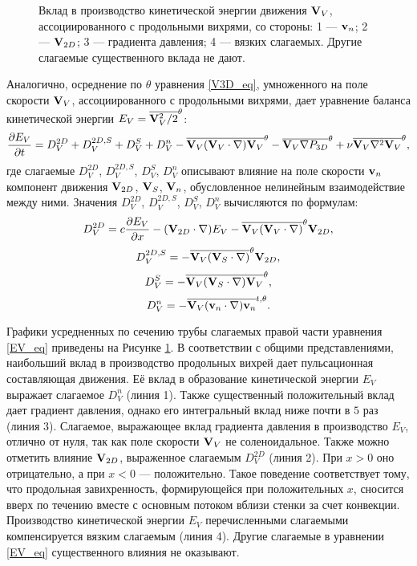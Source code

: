\begin{figure}
\caption{Вклад в производство кинетической энергии движения $\mathbf{V}_V$, ассоциированного с продольными вихрями, со стороны: 1 --- $\mathbf{v}_n$; 2 --- $\mathbf{V}_{2D}$; 3 --- градиента давления; 4 --- вязких слагаемых. Другие слагаемые существенного вклада не дают.}
\label{ev_parts_pic}
\end{figure}

Аналогично, осреднение по $\theta$ уравнения \eqref{V3D_eq}, умноженного на поле скорости $\mathbf{V}_V$, ассоциированного с продольными вихрями, дает уравнение баланса кинетической энергии $E_V = \overline{\mathbf{V}_V^2/2}^\theta$:
\begin{equation}\label{EV_eq}
\frac{\partial E_V}{\partial t} = D_V^{2D} + D_V^{2D,S} + D_V^{S} + D_V^n - \overline{\mathbf{V}_V (\mathbf{V}_V \cdot \nabla) \mathbf{V}_V}^\theta - \overline{\mathbf{V}_V \nabla P_{3D}}^\theta + \nu \overline{\mathbf{V}_V \nabla^2 \mathbf{V}_V}^\theta,
\end{equation}
где слагаемые $D_V^{2D}$, $D_V^{2D,S}$, $D_V^S$, $D_V^n$ описывают влияние на поле скорости $\mathbf{v}_n$ компонент движения $\mathbf{V}_{2D}$, $\mathbf{V}_S$, $\mathbf{V}_n$, обусловленное нелинейным взаимодействие между ними. Значения $D_V^{2D}$, $D_V^{2D,S}$, $D_V^S$, $D_V^n$ вычисляются по формулам:
$$
D_V^{2D} = c \frac{\partial E_V}{\partial x} - (\mathbf{V}_{2D} \cdot \nabla) E_V - \overline{\mathbf{V}_V (\mathbf{V}_V \cdot \nabla)}^\theta \mathbf{V}_{2D},
$$
$$
D_V^{2D,S} = - \overline{\mathbf{V}_V (\mathbf{V}_S \cdot \nabla)}^\theta \mathbf{V}_{2D},
$$
$$
D_V^{S} = - \overline{\mathbf{V}_V (\mathbf{V}_S \cdot \nabla) \mathbf{V}_V}^\theta,
$$
$$
D_V^n = - \overline{\mathbf{V}_V (\mathbf{v}_n \cdot \nabla) \mathbf{v}_n}^{t,\theta}.
$$

Графики усредненных по сечению трубы слагаемых правой части уравнения \eqref{EV_eq} приведены на Рисунке \ref{ev_parts_pic}. В соответствии с общими представлениями, наибольший вклад в производство продольных вихрей дает пульсационная составляющая движения. Её вклад в образование кинетической энергии $E_V$ выражает слагаемое $D_V^n$ (линия 1). Также существенный положительный вклад дает градиент давления, однако его интегральный вклад ниже почти в $5$ раз (линия 3). Слагаемое, выражающее вклад градиента давления в производство $E_V$, отлично от нуля, так как поле скорости $\mathbf{V}_V$ не соленоидальное. Также можно отметить влияние $\mathbf{V}_{2D}$, выраженное слагаемым $D_V^{2D}$ (линия 2). При $x > 0$ оно отрицательно, а при $x < 0$ --- положительно. Такое поведение соответствует тому, что продольная завихренность, формирующейся при положительных $x$, сносится вверх по течению вместе с основным потоком вблизи стенки за счет конвекции. Производство кинетической энергии $E_V$ перечисленными слагаемыми компенсируется вязким слагаемым (линия 4). Другие слагаемые в уравнении \eqref{EV_eq} существенного влияния не оказывают. 


